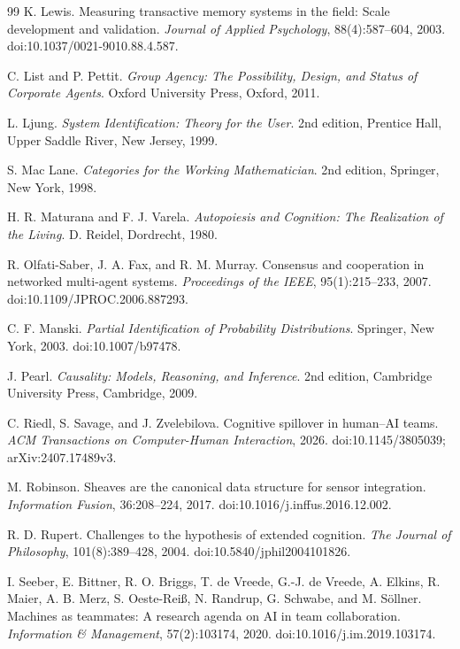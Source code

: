 \begin{thebibliography}{99}
K. Lewis.
\newblock Measuring transactive memory systems in the field: Scale development and validation.
\newblock \emph{Journal of Applied Psychology}, 88(4):587--604, 2003.
\newblock doi:10.1037/0021-9010.88.4.587.

C. List and P. Pettit.
\newblock \emph{Group Agency: The Possibility, Design, and Status of Corporate Agents}.
\newblock Oxford University Press, Oxford, 2011.

L. Ljung.
\newblock \emph{System Identification: Theory for the User}.
\newblock 2nd edition, Prentice Hall, Upper Saddle River, New Jersey, 1999.

S. Mac Lane.
\newblock \emph{Categories for the Working Mathematician}.
\newblock 2nd edition, Springer, New York, 1998.

H. R. Maturana and F. J. Varela.
\newblock \emph{Autopoiesis and Cognition: The Realization of the Living}.
\newblock D. Reidel, Dordrecht, 1980.

R. Olfati-Saber, J. A. Fax, and R. M. Murray.
\newblock Consensus and cooperation in networked multi-agent systems.
\newblock \emph{Proceedings of the IEEE}, 95(1):215--233, 2007.
\newblock doi:10.1109/JPROC.2006.887293.

C. F. Manski.
\newblock \emph{Partial Identification of Probability Distributions}.
\newblock Springer, New York, 2003.
\newblock doi:10.1007/b97478.

J. Pearl.
\newblock \emph{Causality: Models, Reasoning, and Inference}.
\newblock 2nd edition, Cambridge University Press, Cambridge, 2009.

C. Riedl, S. Savage, and J. Zvelebilova.
\newblock Cognitive spillover in human--AI teams.
\newblock \emph{ACM Transactions on Computer-Human Interaction}, 2026.
\newblock doi:10.1145/3805039; arXiv:2407.17489v3.

M. Robinson.
\newblock Sheaves are the canonical data structure for sensor integration.
\newblock \emph{Information Fusion}, 36:208--224, 2017.
\newblock doi:10.1016/j.inffus.2016.12.002.

R. D. Rupert.
\newblock Challenges to the hypothesis of extended cognition.
\newblock \emph{The Journal of Philosophy}, 101(8):389--428, 2004.
\newblock doi:10.5840/jphil2004101826.

I. Seeber, E. Bittner, R. O. Briggs, T. de Vreede, G.-J. de Vreede, A. Elkins, R. Maier, A. B. Merz, S. Oeste-Rei\ss, N. Randrup, G. Schwabe, and M. S\"ollner.
\newblock Machines as teammates: A research agenda on AI in team collaboration.
\newblock \emph{Information \& Management}, 57(2):103174, 2020.
\newblock doi:10.1016/j.im.2019.103174.


\end{thebibliography}
